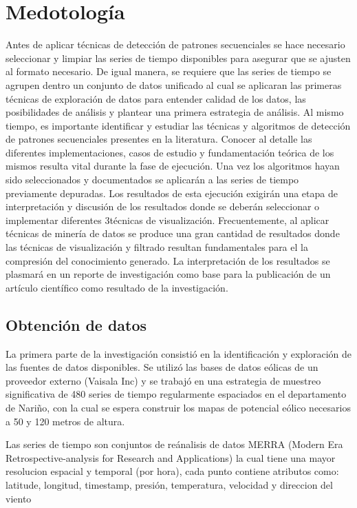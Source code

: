 \section{Medotología}


Antes de aplicar técnicas de detección de patrones secuenciales se hace necesario 
seleccionar y limpiar las series de tiempo disponibles para asegurar que
se ajusten al formato necesario. De igual manera, se requiere que las series de
tiempo se agrupen dentro un conjunto de datos unificado al cual se aplicaran las
primeras técnicas de exploración de datos para entender calidad de los datos,
las posibilidades de análisis y plantear una primera estrategia de análisis.
Al mismo tiempo, es importante identificar y estudiar las técnicas y algoritmos
 de detección de patrones secuenciales presentes en la literatura. Conocer
al detalle las diferentes implementaciones, casos de estudio y fundamentación
teórica de los mismos resulta vital durante la fase de ejecución. Una vez los
algoritmos hayan sido seleccionados y documentados se aplicarán a las series de
tiempo previamente depuradas.
Los resultados de esta ejecución exigirán una etapa de interpretación y discusión
 de los resultados donde se deberán seleccionar o implementar diferentes
3técnicas de visualización. Frecuentemente, al aplicar técnicas de minería de datos
se produce una gran cantidad de resultados donde las técnicas de visualización y
filtrado resultan fundamentales para el la compresión del conocimiento generado.
La interpretación de los resultados se plasmará en un reporte de investigación
como base para la publicación de un artículo científico como resultado de la
investigación.

\subsection{Obtención de datos}

La primera parte de la investigación consistió en la identificación y exploración
 de las fuentes de datos disponibles. Se utilizó las
bases de datos eólicas de un proveedor externo (Vaisala Inc) y se trabajó
en una estrategia de muestreo significativa de
480 series de tiempo regularmente espaciados en el departamento de Nariño,
con la cual se espera construir los mapas de potencial eólico
necesarios a 50 y 120 metros de altura. 

Las series de tiempo son conjuntos de reánalisis de datos MERRA (Modern Era Retrospective-analysis for Research and Applications) la cual
tiene una mayor resolucion espacial y temporal (por hora), cada punto contiene
atributos como: latitude, longitud, timestamp, presión, temperatura, velocidad y direccion del viento

